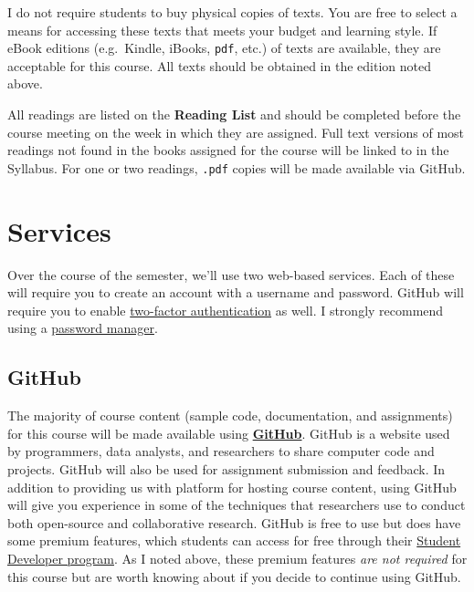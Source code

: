 \documentclass[]{book}
\begin{document}
I do not require students to buy physical copies of texts. You are free to select a means for accessing these texts that meets your budget and learning style. If eBook editions (e.g.~Kindle, iBooks, \texttt{pdf}, etc.) of texts are available, they are acceptable for this course. All texts should be obtained in the edition noted above.

All readings are listed on the \textbf{Reading List} and should be completed before the course meeting on the week in which they are assigned. Full text versions of most readings not found in the books assigned for the course will be linked to in the Syllabus. For one or two readings, \texttt{.pdf} copies will be made available via GitHub.

\hypertarget{services}{%
\section{Services}\label{services}}

Over the course of the semester, we'll use two web-based services. Each of these will require you to create an account with a username and password. GitHub will require you to enable \href{https://en.wikipedia.org/wiki/Multi-factor_authentication}{two-factor authentication} as well. I strongly recommend using a \href{https://lifehacker.com/5529133/five-best-password-managers}{password manager}.

\hypertarget{github}{%
\subsection{GitHub}\label{github}}

The majority of course content (sample code, documentation, and assignments) for this course will be made available using \textbf{\href{http://www.github.com}{GitHub}}. GitHub is a website used by programmers, data analysts, and researchers to share computer code and projects. GitHub will also be used for assignment submission and feedback. In addition to providing us with platform for hosting course content, using GitHub will give you experience in some of the techniques that researchers use to conduct both open-source and collaborative research. GitHub is free to use but does have some premium features, which students can access for free through their \href{https://education.github.com/pack/}{Student Developer program}. As I noted above, these premium features \emph{are not required} for this course but are worth knowing about if you decide to continue using GitHub.
\end{document}

